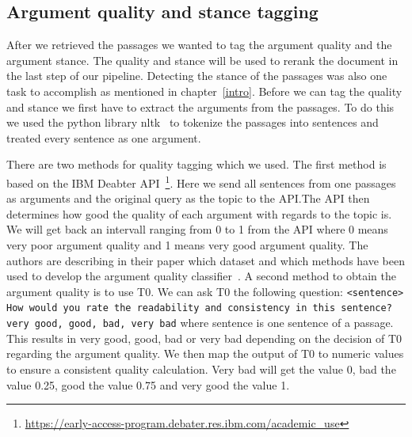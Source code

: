    \subsection{Argument quality and stance tagging}
        After we retrieved the passages we wanted to tag the argument quality and the argument stance. The quality and stance  will be used to rerank the document in the last step of our pipeline. Detecting the stance of the passages was also one task to accomplish as mentioned in chapter~\ref{intro}. Before we can tag the quality and stance we first have to extract the arguments from the passages. To do this we used the python library nltk~\cite{BirdLK2009} to tokenize the passages into sentences and treated every sentence as one argument.\par
        There are two methods for quality tagging which we used. The first method is based on the IBM Deabter API~\footnote{\url{https://early-access-program.debater.res.ibm.com/academic_use}}. Here we send all sentences from one passages as arguments and the original query as the topic to the API.The API then determines how good the quality of each argument with regards to the topic is. We will get back an intervall ranging from 0 to 1 from the API where 0 means very poor argument quality and 1 means very good argument quality. The authors \citeauthor{ToledoG2019} are describing in their paper which dataset and which methods have been used to develop the argument quality classifier~\cite{ToledoG2019}. A second method to obtain the argument quality is to use T0. We can ask T0 the following question: \texttt{<sentence> How would you rate the readability and
        consistency in this sentence? very good, good, bad, very bad} where sentence is one sentence of a passage. This results in very good, good, bad or very bad depending on the decision of T0 regarding the argument quality. We then map the output of T0 to numeric values to ensure a consistent quality calculation. Very bad will get the value 0, bad the value 0.25, good the value 0.75 and very good the value 1.\par
